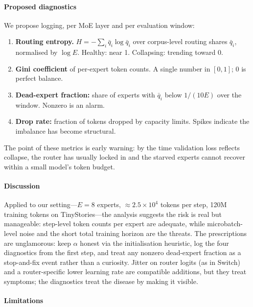 \paragraph{Proposed diagnostics}
\label{sec:diagnostics}

We propose logging, per MoE layer and per evaluation window:

\begin{enumerate}
  \item \textbf{Routing entropy.}
    $H = -\sum_i \bar{q}_i \log \bar{q}_i$ over corpus-level routing
    shares $\bar{q}_i$, normalised by $\log E$. Healthy: near 1.
    Collapsing: trending toward 0.
  \item \textbf{Gini coefficient} of per-expert token counts.
    A single number in $[0,1]$; 0 is perfect balance.
  \item \textbf{Dead-expert fraction:} share of experts with
    $\bar{q}_i$ below $1/(10E)$ over the window. Nonzero is an alarm.
  \item \textbf{Drop rate:} fraction of tokens dropped by capacity
    limits. Spikes indicate the imbalance has become structural.
\end{enumerate}
The point of these metrics is early warning: by the time validation
loss reflects collapse, the router has usually locked in and the
starved experts cannot recover within a small model's token budget.

\paragraph{Discussion}

Applied to our setting---$E=8$ experts, $\approx 2.5 \times 10^4$
tokens per step, 120M training tokens on TinyStories---the analysis
suggests the risk is real but manageable: step-level token counts
per expert are adequate, while microbatch-level noise and the short
total training horizon are the threats. The prescriptions are
unglamorous: keep $\alpha$ honest via the initialisation heuristic,
log the four diagnostics from the first step, and treat any nonzero
dead-expert fraction as a stop-and-fix event rather than a curiosity.
Jitter on router logits (as in Switch) and a router-specific lower
learning rate are compatible additions, but they treat symptoms;
the diagnostics treat the disease by making it visible.

\paragraph{Limitations}

